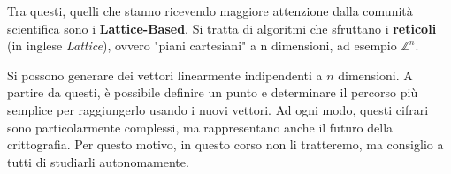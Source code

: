 \documentclass{report}
\begin{document}
Tra questi, quelli che stanno ricevendo maggiore attenzione dalla comunità scientifica sono i \textbf{Lattice-Based}. Si tratta di algoritmi che sfruttano i \textbf{reticoli} (in inglese \textit{Lattice}), ovvero "piani cartesiani" a n dimensioni, ad esempio $\mathbb{Z} ^ n$.

Si possono generare dei vettori linearmente indipendenti a $n$ dimensioni. A partire da questi, è possibile definire un punto e determinare il percorso più semplice per raggiungerlo usando i nuovi vettori. Ad ogni modo, questi cifrari sono particolarmente complessi, ma rappresentano anche il futuro della crittografia. Per questo motivo, in questo corso non li tratteremo, ma consiglio a tutti di studiarli autonomamente.
\end{document}
